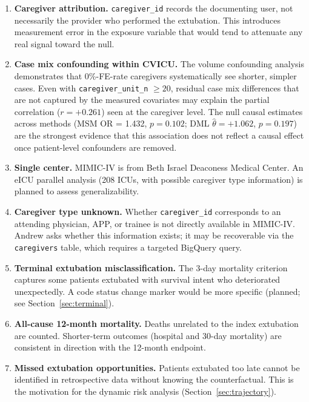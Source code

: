 \documentclass[11pt]{article}
\begin{document}
\begin{enumerate}[leftmargin=*]

\item \textbf{Caregiver attribution.} \texttt{caregiver\_id} records the
documenting user, not necessarily the provider who performed the extubation.
This introduces measurement error in the exposure variable that would tend to
attenuate any real signal toward the null.

\item \textbf{Case mix confounding within CVICU.} The volume confounding
analysis demonstrates that 0\%-FE-rate caregivers systematically see shorter,
simpler cases. Even with \texttt{caregiver\_unit\_n} $\geq 20$, residual case mix
differences that are not captured by the measured covariates may explain the
partial correlation ($r = +0.261$) seen at the caregiver level. The null
causal estimates across methods (MSM OR = 1.432, $p = 0.102$; DML
$\hat{\theta} = +1.062$, $p = 0.197$) are the strongest evidence that this
association does not reflect a causal effect once patient-level confounders
are removed.

\item \textbf{Single center.} MIMIC-IV is from Beth Israel Deaconess Medical
Center. An eICU parallel analysis (208 ICUs, with possible caregiver type
information) is planned to assess generalizability.

\item \textbf{Caregiver type unknown.} Whether \texttt{caregiver\_id}
corresponds to an attending physician, APP, or trainee is not directly
available in MIMIC-IV. Andrew asks whether this information exists; it may
be recoverable via the \texttt{caregivers} table, which requires a targeted
BigQuery query.

\item \textbf{Terminal extubation misclassification.} The 3-day mortality
criterion captures some patients extubated with survival intent who
deteriorated unexpectedly. A code status change marker would be more specific
(planned; see Section~\ref{sec:terminal}).

\item \textbf{All-cause 12-month mortality.} Deaths unrelated to the index
extubation are counted. Shorter-term outcomes (hospital and 30-day mortality)
are consistent in direction with the 12-month endpoint.

\item \textbf{Missed extubation opportunities.} Patients extubated too late
cannot be identified in retrospective data without knowing the counterfactual.
This is the motivation for the dynamic risk analysis (Section~\ref{sec:trajectory}).

\end{enumerate}
\end{document}
